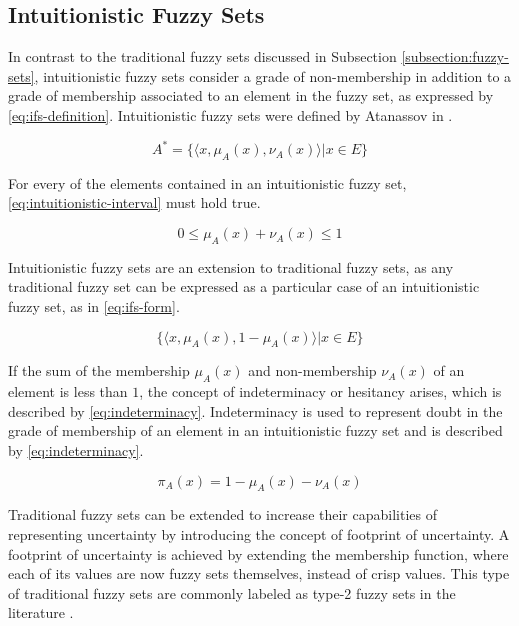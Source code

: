 \subsection{Intuitionistic Fuzzy Sets}
\label{subsection:intuitionistic-fuzzy-sets}

In contrast to the traditional fuzzy sets discussed in Subsection
\ref{subsection:fuzzy-sets}, intuitionistic fuzzy sets consider a grade of
non-membership in addition to a grade of membership associated to an element in
the fuzzy set, as expressed by \ref{eq:ifs-definition}. Intuitionistic fuzzy
sets were defined by Atanassov in \cite{Atanassov1986}.

\begin{equation}
  \label{eq:ifs-definition}
  A^{*} = \{\langle x, \mu _{A} (x), \nu _{A} (x) \rangle | x \in E\}
\end{equation}

For every of the elements contained in an intuitionistic fuzzy set,
\ref{eq:intuitionistic-interval} must hold true.

\begin{equation}
  \label{eq:intuitionistic-interval}
  0 \leq \mu_{A}(x) + \nu_{A}(x) \leq 1
\end{equation}

Intuitionistic fuzzy sets are an extension to traditional fuzzy sets, as any
traditional fuzzy set can be expressed as a particular case of an intuitionistic
fuzzy set, as in \ref{eq:ifs-form}.

\begin{equation}
  \label{eq:ifs-form}
  \{ \langle x, \mu_{A}(x), 1 - \mu_{A}(x) \rangle | x \in E \}
\end{equation}

If the sum of the membership $\mu_{A}(x)$ and non-membership $\nu_{A}(x)$ of an
element is less than $1$, the concept of indeterminacy or hesitancy arises,
which is described by \ref{eq:indeterminacy}. Indeterminacy is used to represent
doubt in the grade of membership of an element in an intuitionistic fuzzy set
and is described by \ref{eq:indeterminacy}.

\begin{equation}
  \label{eq:indeterminacy}
  \pi_{A}(x) = 1 - \mu_{A}(x) - \nu_{A}(x)
\end{equation}

Traditional fuzzy sets can be extended to increase their capabilities of
representing uncertainty by introducing the concept of footprint of
uncertainty. A footprint of uncertainty is achieved by extending the membership
function, where each of its values are now fuzzy sets themselves, instead of
crisp values. This type of traditional fuzzy sets are commonly labeled as type-2
fuzzy sets in the literature \cite{Mendel2006}.

